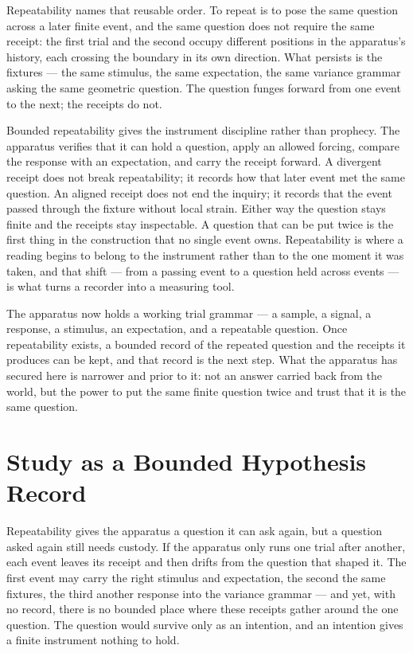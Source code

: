 Repeatability names that reusable order. To repeat is to pose the same question across a later finite event, and the same question does not require the same receipt: the first trial and the second occupy different positions in the apparatus's history, each crossing the boundary in its own direction. What persists is the fixtures --- the same stimulus, the same expectation, the same variance grammar asking the same geometric question. The question funges forward from one event to the next; the receipts do not.

Bounded repeatability gives the instrument discipline rather than prophecy. The apparatus verifies that it can hold a question, apply an allowed forcing, compare the response with an expectation, and carry the receipt forward. A divergent receipt does not break repeatability; it records how that later event met the same question. An aligned receipt does not end the inquiry; it records that the event passed through the fixture without local strain. Either way the question stays finite and the receipts stay inspectable. A question that can be put twice is the first thing in the construction that no single event owns. Repeatability is where a reading begins to belong to the instrument rather than to the one moment it was taken, and that shift --- from a passing event to a question held across events --- is what turns a recorder into a measuring tool.

The apparatus now holds a working trial grammar --- a sample, a signal, a response, a stimulus, an expectation, and a repeatable question. Once repeatability exists, a bounded record of the repeated question and the receipts it produces can be kept, and that record is the next step. What the apparatus has secured here is narrower and prior to it: not an answer carried back from the world, but the power to put the same finite question twice and trust that it is the same question.

\section{Study as a Bounded Hypothesis Record}

Repeatability gives the apparatus a question it can ask again, but a question asked again still needs custody. If the apparatus only runs one trial after another, each event leaves its receipt and then drifts from the question that shaped it. The first event may carry the right stimulus and expectation, the second the same fixtures, the third another response into the variance grammar --- and yet, with no record, there is no bounded place where these receipts gather around the one question. The question would survive only as an intention, and an intention gives a finite instrument nothing to hold.

